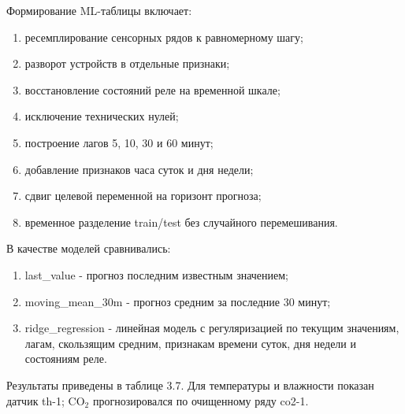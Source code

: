 \documentclass[a4paper,14pt]{extarticle}
\renewcommand{\texttt}[1]{\textnormal{#1}}
\providecommand{\tightlist}{%
  \setlength{\itemsep}{0pt}\setlength{\parskip}{0pt}}
\begin{document}
Формирование ML-таблицы включает:

\begin{enumerate}
\def\labelenumi{\arabic{enumi})}
\tightlist
\item
  ресемплирование сенсорных рядов к равномерному шагу;
\item
  разворот устройств в отдельные признаки;
\item
  восстановление состояний реле на временной шкале;
\item
  исключение технических нулей;
\item
  построение лагов 5, 10, 30 и 60 минут;
\item
  добавление признаков часа суток и дня недели;
\item
  сдвиг целевой переменной на горизонт прогноза;
\item
  временное разделение train/test без случайного перемешивания.
\end{enumerate}

В качестве моделей сравнивались:

\begin{enumerate}
\def\labelenumi{\arabic{enumi})}
\tightlist
\item
  \texttt{last\_value} - прогноз последним известным значением;
\item
  \texttt{moving\_mean\_30m} - прогноз средним за последние 30 минут;
\item
  \texttt{ridge\_regression} - линейная модель с регуляризацией по
  текущим значениям, лагам, скользящим средним, признакам времени суток,
  дня недели и состояниям реле.
\end{enumerate}

Результаты приведены в таблице 3.7. Для температуры и влажности показан
датчик \texttt{th-1}; CO\(_2\) прогнозировался по очищенному ряду
\texttt{co2-1}.
\end{document}
